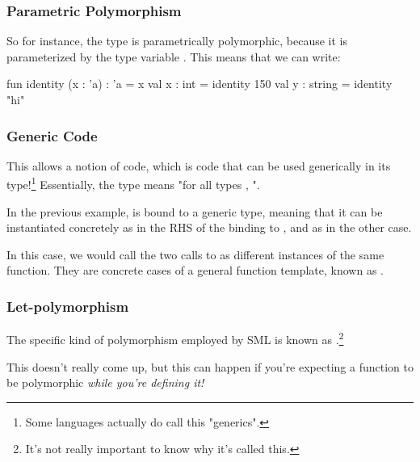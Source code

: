 \documentclass[aspectratio=169]{beamer}
\begin{document}
\begin{frame}[fragile]
  \frametitle{Parametric Polymorphism}


  \pause
  \vspace{\fill}

  So for instance, the type  is parametrically polymorphic,
  because it is parameterized by the type variable . This means
  that we can write:

  \pause
  \vspace{\fill}

  \begin{codeblock}
    fun identity (x : 'a) : 'a = x
    val x : int = identity 150
    val y : string = identity "hi"
  \end{codeblock}
\end{frame}

\begin{frame}[fragile]
  \frametitle{Generic Code}

  This allows a notion of  code, which is code that can be
  used generically in its type!\footnote{
    Some languages actually do call this "generics".
  } Essentially, the type
   means "for all types , ".

  \pause
  \vspace{\fill}

  In the previous example,  is bound to a generic type, meaning
  that it can be instantiated concretely as  in the RHS of
  the binding to , and as  in the other case.

  \pause
  \vspace{\fill}

  In this case, we would call the two calls to  as different
  instances of the same function. They are concrete cases of a general
  function template, known as .
\end{frame}

\begin{frame}[fragile]
  \frametitle{Let-polymorphism}

  The specific kind of polymorphism employed by SML is known as .\footnote{
    It's not really important to know why it's called this.
  }

  \pause
  \vspace{\fill}


  \pause
  \vspace{\fill}

  This doesn't really come up, but this can happen if you're expecting a
  function to be polymorphic \textit{while you're defining it!}
\end{frame}
\end{document}
